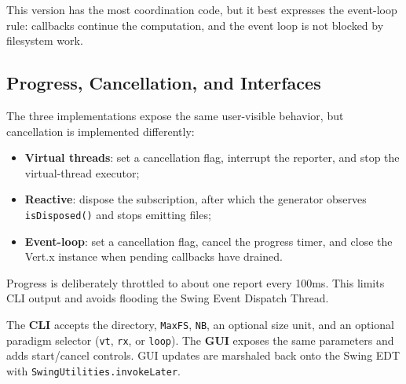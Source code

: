 This version has the most coordination code, but it best expresses the event-loop rule: callbacks continue the computation, and the event loop is not blocked by filesystem work.

\subsection{Progress, Cancellation, and Interfaces}

The three implementations expose the same user-visible behavior, but cancellation is implemented differently:

\begin{itemize}
  \item \textbf{Virtual threads}: set a cancellation flag, interrupt the reporter, and stop the virtual-thread executor;
  \item \textbf{Reactive}: dispose the subscription, after which the generator observes \texttt{isDisposed()} and stops emitting files;
  \item \textbf{Event-loop}: set a cancellation flag, cancel the progress timer, and close the Vert.x instance when pending callbacks have drained.
\end{itemize}

Progress is deliberately throttled to about one report every 100ms.
This limits CLI output and avoids flooding the Swing Event Dispatch Thread.

The \textbf{CLI} accepts the directory, \texttt{MaxFS}, \texttt{NB}, an optional size unit, and an optional paradigm selector (\texttt{vt}, \texttt{rx}, or \texttt{loop}).
The \textbf{GUI} exposes the same parameters and adds start/cancel controls.
GUI updates are marshaled back onto the Swing EDT with \texttt{SwingUtilities.invokeLater}.
